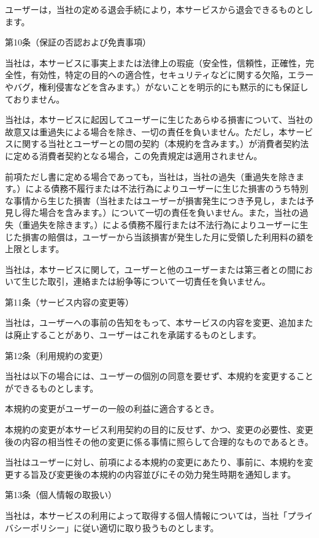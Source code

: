     ユーザーは，当社の定める退会手続により，本サービスから退会できるものとします。

第10条（保証の否認および免責事項）

    当社は，本サービスに事実上または法律上の瑕疵（安全性，信頼性，正確性，完全性，有効性，特定の目的への適合性，セキュリティなどに関する欠陥，エラーやバグ，権利侵害などを含みます。）がないことを明示的にも黙示的にも保証しておりません。

    当社は，本サービスに起因してユーザーに生じたあらゆる損害について、当社の故意又は重過失による場合を除き、一切の責任を負いません。ただし，本サービスに関する当社とユーザーとの間の契約（本規約を含みます。）が消費者契約法に定める消費者契約となる場合，この免責規定は適用されません。

    前項ただし書に定める場合であっても，当社は，当社の過失（重過失を除きます。）による債務不履行または不法行為によりユーザーに生じた損害のうち特別な事情から生じた損害（当社またはユーザーが損害発生につき予見し，または予見し得た場合を含みます。）について一切の責任を負いません。また，当社の過失（重過失を除きます。）による債務不履行または不法行為によりユーザーに生じた損害の賠償は，ユーザーから当該損害が発生した月に受領した利用料の額を上限とします。

    当社は，本サービスに関して，ユーザーと他のユーザーまたは第三者との間において生じた取引，連絡または紛争等について一切責任を負いません。

第11条（サービス内容の変更等）

    当社は，ユーザーへの事前の告知をもって、本サービスの内容を変更、追加または廃止することがあり、ユーザーはこれを承諾するものとします。

第12条（利用規約の変更）

    当社は以下の場合には、ユーザーの個別の同意を要せず、本規約を変更することができるものとします。

        本規約の変更がユーザーの一般の利益に適合するとき。

        本規約の変更が本サービス利用契約の目的に反せず、かつ、変更の必要性、変更後の内容の相当性その他の変更に係る事情に照らして合理的なものであるとき。

    当社はユーザーに対し、前項による本規約の変更にあたり、事前に、本規約を変更する旨及び変更後の本規約の内容並びにその効力発生時期を通知します。

第13条（個人情報の取扱い）

    当社は，本サービスの利用によって取得する個人情報については，当社「プライバシーポリシー」に従い適切に取り扱うものとします。

